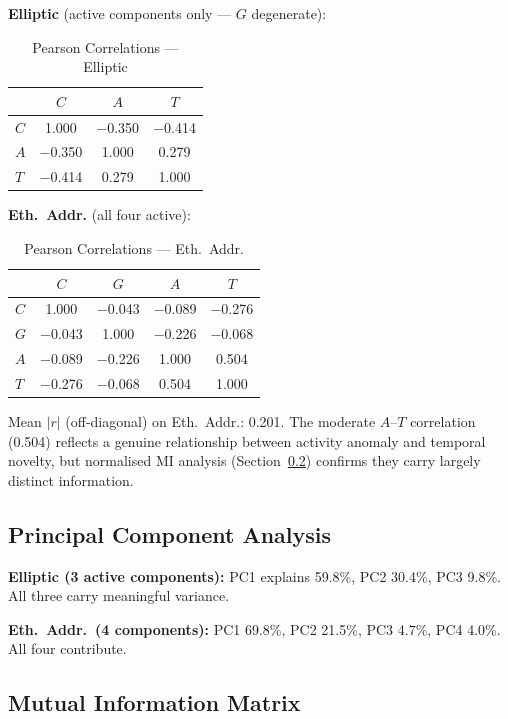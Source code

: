 \documentclass[journal]{IEEEtran}
\begin{document}
\textbf{Elliptic} (active components only --- $G$ degenerate):

\begin{table}[!t]
\centering
\caption{Pearson Correlations --- Elliptic}
\label{tab:corr_elliptic}
\begin{tabular}{@{}lccc@{}}
\toprule
     & $C$    & $A$    & $T$    \\
\midrule
$C$  & 1.000  & $-$0.350 & $-$0.414 \\
$A$  & $-$0.350 & 1.000  & 0.279  \\
$T$  & $-$0.414 & 0.279  & 1.000  \\
\bottomrule
\end{tabular}
\end{table}

\textbf{Eth.\ Addr.} (all four active):

\begin{table}[!t]
\centering
\caption{Pearson Correlations --- Eth.\ Addr.}
\label{tab:corr_eth_addr}
\begin{tabular}{@{}lcccc@{}}
\toprule
     & $C$    & $G$    & $A$    & $T$    \\
\midrule
$C$  & 1.000  & $-$0.043 & $-$0.089 & $-$0.276 \\
$G$  & $-$0.043 & 1.000  & $-$0.226 & $-$0.068 \\
$A$  & $-$0.089 & $-$0.226 & 1.000  & 0.504  \\
$T$  & $-$0.276 & $-$0.068 & 0.504  & 1.000  \\
\bottomrule
\end{tabular}
\end{table}

Mean $|r|$ (off-diagonal) on Eth.\ Addr.: 0.201. The moderate $A$--$T$ correlation (0.504) reflects a genuine relationship between activity anomaly and temporal novelty, but normalised MI analysis (Section~\ref{ssec:mi_matrix}) confirms they carry largely distinct information.

\subsection{Principal Component Analysis}

\textbf{Elliptic (3 active components):} PC1 explains 59.8\%, PC2 30.4\%, PC3 9.8\%. All three carry meaningful variance.

\textbf{Eth.\ Addr.\ (4 components):} PC1 69.8\%, PC2 21.5\%, PC3 4.7\%, PC4 4.0\%. All four contribute.

\subsection{Mutual Information Matrix}
\label{ssec:mi_matrix}
\end{document}

